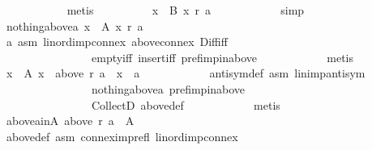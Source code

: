 \begin{isabellebody}
\ \ \ \ \ \ \ \ \ \ \isamarkupfalse%
\ metis\isanewline
\ \ \ \ \ \ \ \ \isamarkupfalse%
\ {\isachardoublequoteopen}{\isasymforall}x\ {\isasymin}\ B{\isachardot}{\kern0pt}\ x\ {\isasympreceq}\isactrlsub r\ a{\isachardoublequoteclose}\isanewline
\ \ \ \ \ \ \ \ \ \ \isamarkupfalse%
\ simp\isanewline
\ \ \ \ \ \ \ \ \isamarkupfalse%
\ nothing{\isacharunderscore}{\kern0pt}above{\isacharunderscore}{\kern0pt}a{\isacharcolon}{\kern0pt}\ {\isachardoublequoteopen}{\isasymforall}x\ {\isasymin}\ A{\isachardot}{\kern0pt}\ x\ {\isasympreceq}\isactrlsub r\ a{\isachardoublequoteclose}\isanewline
\ \ \ \ \ \ \ \ \ \ \isamarkupfalse%
\ a\ asm\ lin{\isacharunderscore}{\kern0pt}ord{\isacharunderscore}{\kern0pt}imp{\isacharunderscore}{\kern0pt}connex\ above{\isacharunderscore}{\kern0pt}connex\ Diff{\isacharunderscore}{\kern0pt}iff\isanewline
\ \ \ \ \ \ \ \ \ \ \ \ \ \ \ \ empty{\isacharunderscore}{\kern0pt}iff\ insert{\isacharunderscore}{\kern0pt}iff\ pref{\isacharunderscore}{\kern0pt}imp{\isacharunderscore}{\kern0pt}in{\isacharunderscore}{\kern0pt}above\isanewline
\ \ \ \ \ \ \ \ \ \ \isamarkupfalse%
\ metis\isanewline
\ \ \ \ \ \ \ \ \isamarkupfalse%
\ {\isachardoublequoteopen}{\isasymforall}x\ {\isasymin}\ A{\isachardot}{\kern0pt}\ x\ {\isasymin}\ above\ r\ a\ {\isasymlongleftrightarrow}\ x\ {\isacharequal}{\kern0pt}\ a{\isachardoublequoteclose}\isanewline
\ \ \ \ \ \ \ \ \ \ \isamarkupfalse%
\ antisym{\isacharunderscore}{\kern0pt}def\ asm\ lin{\isacharunderscore}{\kern0pt}imp{\isacharunderscore}{\kern0pt}antisym\isanewline
\ \ \ \ \ \ \ \ \ \ \ \ \ \ \ \ nothing{\isacharunderscore}{\kern0pt}above{\isacharunderscore}{\kern0pt}a\ pref{\isacharunderscore}{\kern0pt}imp{\isacharunderscore}{\kern0pt}in{\isacharunderscore}{\kern0pt}above\isanewline
\ \ \ \ \ \ \ \ \ \ \ \ \ \ \ \ CollectD\ above{\isacharunderscore}{\kern0pt}def\isanewline
\ \ \ \ \ \ \ \ \ \ \isamarkupfalse%
\ metis\isanewline
\ \ \ \ \ \ \ \ \isamarkupfalse%
\ \isamarkupfalse%
\ above{\isacharunderscore}{\kern0pt}a{\isacharunderscore}{\kern0pt}in{\isacharunderscore}{\kern0pt}A{\isacharcolon}{\kern0pt}\ {\isachardoublequoteopen}above\ r\ a\ {\isasymsubseteq}\ A{\isachardoublequoteclose}\isanewline
\ \ \ \ \ \ \ \ \ \ \isamarkupfalse%
\ above{\isacharunderscore}{\kern0pt}def\ asm\ connex{\isacharunderscore}{\kern0pt}imp{\isacharunderscore}{\kern0pt}refl\ lin{\isacharunderscore}{\kern0pt}ord{\isacharunderscore}{\kern0pt}imp{\isacharunderscore}{\kern0pt}connex\isanewline

\end{isabellebody}
